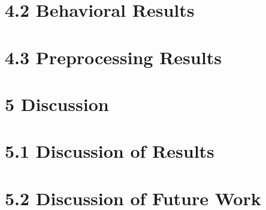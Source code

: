 \documentclass[11pt]{article}
\begin{document}
    \section{4.2 Behavioral Results}
                
    \section{4.3 Preprocessing Results}
                
\section{5 Discussion}

    \section{5.1 Discussion of Results}
            

    \section{5.2 Discussion of Future Work}
            


\end{document}
